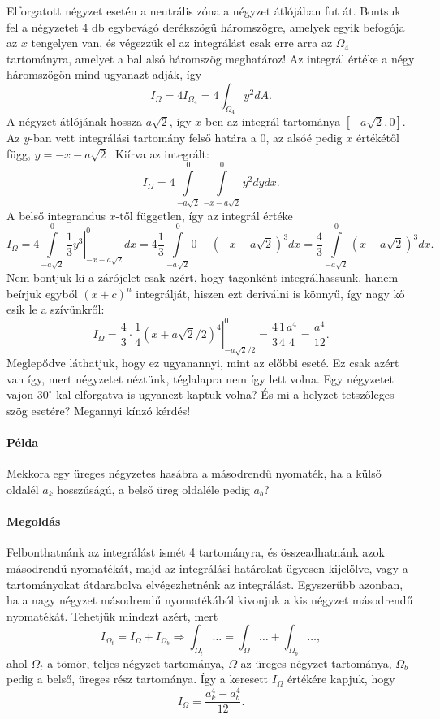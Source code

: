 \documentclass[12pt,a4paper]{scrartcl}
\begin{document}
Elforgatott négyzet esetén a neutrális zóna a négyzet átlójában fut át. Bontsuk fel a négyzetet 4 db egybevágó derékszögű háromszögre, amelyek egyik befogója az $x$ tengelyen van, és végezzük el az integrálást csak erre arra az $\Omega_4$ tartományra, amelyet a bal alsó háromszög meghatároz! Az integrál értéke a négy háromszögön mind ugyanazt adják, így
\[{I_\Omega } = 4{I_{{\Omega _4}}} = 4\int_{{\Omega _4}} {{y^2}dA}.\]
A négyzet átlójának hossza $a\sqrt 2 $, így $x$-ben az integrál tartománya $\left[ { - a\sqrt 2 ,0} \right]$. Az $y$-ban vett integrálási tartomány felső határa a 0, az alsóé pedig $x$ értékétől függ, $y =  - x - a\sqrt 2 $. Kiírva az integrált:
\[{I_\Omega } = 4\int\limits_{ - a\sqrt 2 }^0 {\int\limits_{ - x - a\sqrt 2 }^0 {{y^2}} dy} dx.\]
A belső integrandus $x$-től független, így az integrál értéke
\[{I_\Omega } = 4\int\limits_{ - a\sqrt 2 }^0 {\left. {\frac{1}{3}{y^3}} \right|_{ - x - a\sqrt 2 }^0} dx = 4\frac{1}{3}\int\limits_{ - a\sqrt 2 }^0 {0 - {{\left( { - x - a\sqrt 2 } \right)}^3}} dx = \frac{4}{3}\int\limits_{ - a\sqrt 2 }^0 {{{\left( {x + a\sqrt 2 } \right)}^3}dx} .\]
Nem bontjuk ki a zárójelet csak azért, hogy tagonként integrálhassunk, hanem beírjuk egyből ${\left( {x + c} \right)^n}$ integrálját, hiszen ezt deriválni is könnyű, így nagy kő esik le a szívünkről:
\[{I_\Omega } = \frac{4}{3} \cdot \left. {\frac{1}{4}{{\left( {x + a\sqrt 2 /2} \right)}^4}} \right|_{ - a\sqrt 2 /2}^0 = \frac{4}{3}\frac{1}{4}\frac{{{a^4}}}{4} = \frac{{{a^4}}}{{12}}.\]
Meglepődve láthatjuk, hogy ez ugyanannyi, mint az előbbi eseté. Ez csak azért van így, mert négyzetet néztünk, téglalapra nem így lett volna. Egy négyzetet vajon $30^\circ$-kal elforgatva is ugyanezt kaptuk volna? És mi a helyzet tetszőleges szög esetére? Megannyi kínzó kérdés!

\paragraph{Példa}
Mekkora egy üreges négyzetes hasábra a másodrendű nyomaték, ha a külső oldalél $a_k$ hosszúságú, a belső üreg oldaléle pedig $a_b$?
\paragraph{Megoldás}
Felbonthatnánk az integrálást ismét 4 tartományra, és összeadhatnánk azok másodrendű nyomatékát, majd az integrálási határokat ügyesen kijelölve, vagy a tartományokat átdarabolva elvégezhetnénk az integrálást. Egyszerűbb azonban, ha a nagy négyzet másodrendű nyomatékából kivonjuk a kis négyzet másodrendű nyomatékát. Tehetjük mindezt azért, mert
\[{I_{{\Omega _t}}} = {I_\Omega } + {I_{{\Omega _b}}} \Rightarrow \int_{{\Omega _t}}  \ldots   = \int_\Omega   \ldots   + \int_{{\Omega _b}}  \ldots ,\]
ahol ${\Omega _t}$ a tömör, teljes négyzet tartománya, $\Omega$ az üreges négyzet tartománya, $\Omega_b$ pedig a belső, üreges rész tartománya. Így a keresett $I_\Omega$ értékére kapjuk, hogy
\[{I_\Omega } = \frac{{a_k^4 - a_b^4}}{{12}}.\]
\end{document}
